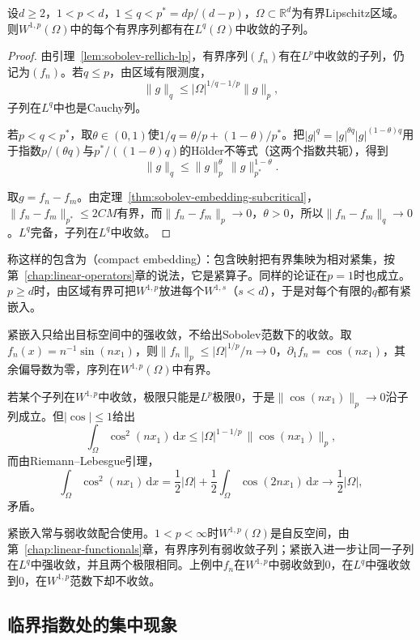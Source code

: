 \begin{theorem}[紧嵌入]
\label{thm:sobolev-rellich}
设$d\geq2$，$1<p<d$，$1\leq q<p^*=dp/(d-p)$，$\Omega\subset\mathbb R^d$为有界Lipschitz区域。则$W^{1,p}(\Omega)$中的每个有界序列都有在$L^q(\Omega)$中收敛的子列。
\end{theorem}

\begin{proof}
由引理~\ref{lem:sobolev-rellich-lp}，有界序列$(f_n)$有在$L^p$中收敛的子列，仍记为$(f_n)$。若$q\leq p$，由区域有限测度，
\[
\lVert g\rVert_q\leq|\Omega|^{1/q-1/p}\lVert g\rVert_p,
\]
子列在$L^q$中也是Cauchy列。

若$p<q<p^*$，取$\theta\in(0,1)$使$1/q=\theta/p+(1-\theta)/p^*$。把$|g|^q=|g|^{\theta q}|g|^{(1-\theta)q}$用于指数$p/(\theta q)$与$p^*/((1-\theta)q)$的Hölder不等式（这两个指数共轭），得到
\[
\lVert g\rVert_q\leq\lVert g\rVert_p^\theta\,\lVert g\rVert_{p^*}^{1-\theta}.
\]

取$g=f_n-f_m$。由定理~\ref{thm:sobolev-embedding-subcritical}，$\lVert f_n-f_m\rVert_{p^*}\leq2CM$有界，而$\lVert f_n-f_m\rVert_p\to0$，$\theta>0$，所以$\lVert f_n-f_m\rVert_q\to0$。$L^q$完备，子列在$L^q$中收敛。
\end{proof}

称这样的包含为（compact embedding）：包含映射把有界集映为相对紧集，按第~\ref{chap:linear-operators}章的说法，它是紧算子。同样的论证在$p=1$时也成立。$p\geq d$时，由区域有界可把$W^{1,p}$放进每个$W^{1,s}$（$s<d$），于是对每个有限的$q$都有紧嵌入。

紧嵌入只给出目标空间中的强收敛，不给出Sobolev范数下的收敛。取$f_n(x)=n^{-1}\sin(nx_1)$，则$\lVert f_n\rVert_p\leq|\Omega|^{1/p}/n\to0$，$\partial_1f_n=\cos(nx_1)$，其余偏导数为零，序列在$W^{1,p}(\Omega)$中有界。

若某个子列在$W^{1,p}$中收敛，极限只能是$L^p$极限$0$，于是$\lVert\cos(nx_1)\rVert_p\to0$沿子列成立。但$|\cos|\leq1$给出
\[
\int_\Omega\cos^2(nx_1)\,\mathrm dx\leq|\Omega|^{1-1/p}\,\lVert\cos(nx_1)\rVert_p,
\]
而由Riemann--Lebesgue引理，
\[
\int_\Omega\cos^2(nx_1)\,\mathrm dx=\frac12|\Omega|+\frac12\int_\Omega\cos(2nx_1)\,\mathrm dx\to\frac12|\Omega|,
\]
矛盾。

紧嵌入常与弱收敛配合使用。$1<p<\infty$时$W^{1,p}(\Omega)$是自反空间，由第~\ref{chap:linear-functionals}章，有界序列有弱收敛子列；紧嵌入进一步让同一子列在$L^q$中强收敛，并且两个极限相同。上例中$f_n$在$W^{1,p}$中弱收敛到$0$，在$L^q$中强收敛到$0$，在$W^{1,p}$范数下却不收敛。

\subsection{临界指数处的集中现象}
\label{sec:sobolev-concentration}

